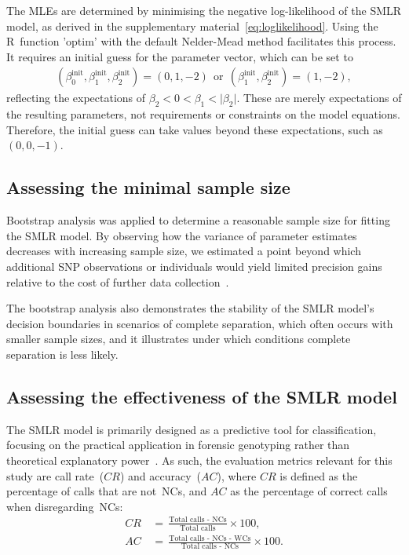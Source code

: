 \documentclass[preprint,5p,times,11pt]{elsarticle}
\begin{document}
The MLEs are determined by minimising the negative log-likelihood of the SMLR model, as derived in the supplementary material~\eqref{eq:loglikelihood}.
Using the R~function 'optim' with the default Nelder-Mead method facilitates this process.
It requires an initial guess for the parameter vector, which can be set to
\begin{align*}
\left(\beta_0^{\text{init}}, \beta_1^{\text{init}}, \beta_2^{\text{init}}\right)
=
\left(0, 1, -2\right)
\ \ \text{or} \ \ 
\left(\beta_1^{\text{init}}, \beta_2^{\text{init}}\right)
=
\left(1, -2\right),
\end{align*}
reflecting the expectations of $\beta_2 < 0 < \beta_1 < \lvert \beta_2 \rvert$.
These are merely expectations of the resulting parameters, not requirements or constraints on the model equations.
Therefore, the initial guess can take values beyond these expectations, such as $(0, 0, -1)$.


\subsection{Assessing the minimal sample size}
Bootstrap analysis was applied to determine a reasonable sample size for fitting the SMLR model.
By observing how the variance of parameter estimates decreases with increasing sample size, we estimated a point beyond which additional SNP observations or individuals would yield limited precision gains relative to the cost of further data collection~\cite{efron}.

The bootstrap analysis also demonstrates the stability of the SMLR model's decision boundaries in scenarios of complete separation, which often occurs with smaller sample sizes, and it illustrates under which conditions complete separation is less likely.


\subsection{Assessing the effectiveness of the SMLR model}
The SMLR model is primarily designed as a predictive tool for classification, focusing on the practical application in forensic genotyping rather than theoretical explanatory power~\cite{shmueli}.
As such, the evaluation metrics relevant for this study are call rate~($CR$) and accuracy~($AC$), where $CR$ is defined as the percentage of calls that are not~NCs, and $AC$ as the percentage of correct calls when disregarding~NCs:
\begin{align*}
CR \, &= \, \frac{\text{Total calls - NCs}}{\text{Total calls}} \times 100, \\
AC \, &= \, \frac{\text{Total calls - NCs - WCs}}{\text{Total calls - NCs}} \times 100.
\end{align*}
\end{document}
